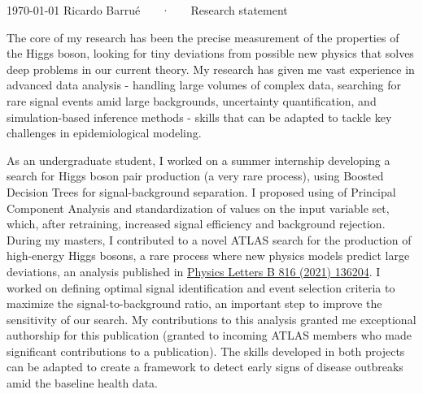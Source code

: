 \documentclass[11pt, a4paper]{awesome-cv}
\begin{document}
\makecvheader[R]

\makecvfooter
  {\today}
  {Ricardo Barrué ~~~·~~~ Research statement}
  {}

\makelettertitle

\begin{cvletter}

The core of my research has been the precise measurement of the properties of the Higgs boson, looking for tiny deviations from possible new physics that solves deep problems in our current theory. My research has given me vast experience in advanced data analysis - handling large volumes of complex data, searching for rare signal events amid large backgrounds, uncertainty quantification, and simulation-based inference methods - skills that can be adapted to tackle key challenges in epidemiological modeling.


As an undergraduate student, I worked on a summer internship developing a search for Higgs boson pair production (a very rare process), using Boosted Decision Trees for signal-background separation. I proposed using of Principal Component Analysis and standardization of values on the input variable set, which, after retraining, increased  signal efficiency and background rejection. During my masters, I contributed to a novel ATLAS search for the production of high-energy Higgs bosons, a rare process where new physics models predict large deviations, an analysis published in \href{https://doi.org/10.1016/j.physletb.2021.136204}{Physics Letters B 816 (2021) 136204}. I worked on defining optimal signal identification and event selection criteria to maximize the signal-to-background ratio, an important step to improve the sensitivity of our search. My contributions to this analysis granted me exceptional authorship for this publication (granted to incoming ATLAS members who made significant contributions to a publication). The skills developed in both projects can be adapted to create a framework to detect early signs of disease outbreaks amid the baseline health data. %


\end{cvletter}
\end{document}
